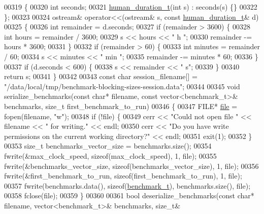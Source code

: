 \begin{DoxyCode}
00319 \{
00320   \textcolor{keywordtype}{int} seconds;
00321   \hyperlink{structhuman__duration__t}{human\_duration\_t}(\textcolor{keywordtype}{int} s) : seconds(s) \{\}
00322 \};
00323 
00324 ostream& operator<<(ostream& s, \textcolor{keyword}{const} \hyperlink{structhuman__duration__t}{human\_duration\_t}& d)
00325 \{
00326   \textcolor{keywordtype}{int} remainder = d.seconds;
00327   \textcolor{keywordflow}{if} (remainder > 3600) \{
00328     \textcolor{keywordtype}{int} hours = remainder / 3600;
00329     s << hours << \textcolor{stringliteral}{" h "};
00330     remainder -= hours * 3600;
00331   \}
00332   \textcolor{keywordflow}{if} (remainder > 60) \{
00333     \textcolor{keywordtype}{int} minutes = remainder / 60;
00334     s << minutes << \textcolor{stringliteral}{" min "};
00335     remainder -= minutes * 60;
00336   \}
00337   \textcolor{keywordflow}{if} (d.seconds < 600) \{
00338     s << remainder << \textcolor{stringliteral}{" s"};
00339   \}
00340   \textcolor{keywordflow}{return} s;
00341 \}
00342 
00343 \textcolor{keyword}{const} \textcolor{keywordtype}{char} session\_filename[] = \textcolor{stringliteral}{"/data/local/tmp/benchmark-blocking-sizes-session.data"};
00344 
00345 \textcolor{keywordtype}{void} serialize\_benchmarks(\textcolor{keyword}{const} \textcolor{keywordtype}{char}* filename, \textcolor{keyword}{const} vector<benchmark\_t>& benchmarks, \textcolor{keywordtype}{size\_t} 
      first\_benchmark\_to\_run)
00346 \{
00347   FILE* \hyperlink{structfile}{file} = fopen(filename, \textcolor{stringliteral}{"w"});
00348   \textcolor{keywordflow}{if} (!file) \{
00349     cerr << \textcolor{stringliteral}{"Could not open file "} << filename << \textcolor{stringliteral}{" for writing."} << endl;
00350     cerr << \textcolor{stringliteral}{"Do you have write permissions on the current working directory?"} << endl;
00351     exit(1);
00352   \}
00353   \textcolor{keywordtype}{size\_t} benchmarks\_vector\_size = benchmarks.size();
00354   fwrite(&max\_clock\_speed, \textcolor{keyword}{sizeof}(max\_clock\_speed), 1, file);
00355   fwrite(&benchmarks\_vector\_size, \textcolor{keyword}{sizeof}(benchmarks\_vector\_size), 1, file);
00356   fwrite(&first\_benchmark\_to\_run, \textcolor{keyword}{sizeof}(first\_benchmark\_to\_run), 1, file);
00357   fwrite(benchmarks.data(), \textcolor{keyword}{sizeof}(\hyperlink{structbenchmark__t}{benchmark\_t}), benchmarks.size(), file);
00358   fclose(file);
00359 \}
00360 
00361 \textcolor{keywordtype}{bool} deserialize\_benchmarks(\textcolor{keyword}{const} \textcolor{keywordtype}{char}* filename, vector<benchmark\_t>& benchmarks, \textcolor{keywordtype}{size\_t}& 

\end{DoxyCode}
